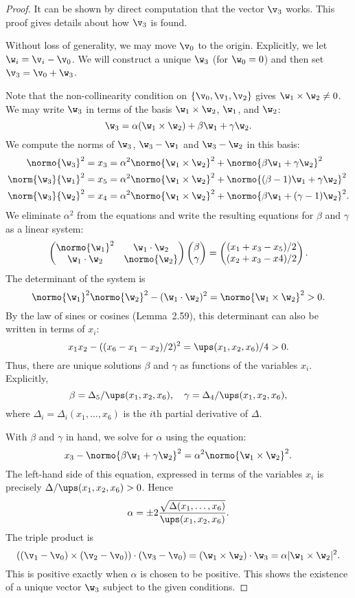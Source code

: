 \begin{proof}
It can be shown by direct computation that the vector $\v_3$ works.  This proof gives details about how
$\v_3$ is found.

Without loss of generality, we may move $\v_0$ to the origin.  Explicitly,
we let $\w_i = \v_i - \v_0$.  We will construct a unique $\w_3$ (for $\w_0=0$) and then set $\v_3 = \v_0 + \w_3$.

Note that the non-collinearity condition on $\{\v_0,\v_1,\v_2\}$ gives $\w_1\times\w_2\ne 0$.
We may write $\w_3$ in terms of the basis $\w_1\times\w_2$, $\w_1$, and $\w_2$:
\[
\w_3 = \alpha (\w_1\times \w_2) + \beta \w_1 + \gamma \w_2.
\]
We compute the norms of $\w_3$, $\w_3 - \w_1$ and $\w_3-\w_2$ in this basis:
\begin{align*}
\normo{\w_3}^2 = x_3 &= \alpha^2 \normo{\w_1\times\w_2}^2 + \normo{\beta\w_1+\gamma\w_2}^2 \\
\norm{\w_3}{\w_1}^2 = x_5 &= \alpha^2 \normo{\w_1\times\w_2}^2 + \normo{(\beta-1)\w_1 + \gamma\w_2}^2\\
\norm{\w_3}{\w_2}^2 = x_4 &= \alpha^2\normo{\w_1\times\w_2}^2 +\normo{\beta\w_1 + (\gamma-1)\w_2}^2.
\end{align*}
We eliminate $\alpha^2$ from the equations and write the resulting equations for $\beta$ and $\gamma$ as
a linear system:
\[
\left(\begin{matrix} \normo{\w_1}^2 & \w_1\cdot \w_2 \\ \w_1\cdot \w_2 & \normo{\w_2} \end{matrix}\right)
\left(\begin{matrix} \beta \\ \gamma \end{matrix}\right) = 
\left(\begin{matrix} (x_1 + x_3 - x_5)/2 \\ (x_2 + x_3 - x4)/2 \end{matrix}\right).
\]
The determinant of the system is 
\[
\normo{\w_1}^2\normo{\w_2}^2 - (\w_1\cdot \w_2)^2 = \normo{\w_1\times \w_2}^2 >  0.
\]
By the law of sines or cosines (Lemma~2.59), this determinant can also be written in terms of $x_i$:
\[
x_1 x_2 - ((x_6 - x_1 - x_2)/2)^2 = \ups(x_1,x_2,x_6)/4 > 0.
\]
Thus, there are unique solutions $\beta$ and $\gamma$ as functions of the variables $x_i$. Explicitly,
\[
\beta = \Delta_5/\ups(x_1,x_2,x_6),\quad \gamma = \Delta_4/\ups(x_1,x_2,x_6),
\]
where $\Delta_i=\Delta_i(x_1,\ldots,x_6)$ is the $i$th partial derivative of $\Delta$.

With $\beta$ and $\gamma$ in hand, we solve for $\alpha$ using the equation:
\[
x_3 - \normo{\beta\w_1 + \gamma\w_2}^2 = \alpha^2 \normo{\w_1\times \w_2}^2.
\]
The left-hand side of this equation, expressed in terms of the variables $x_i$ is precisely $\Delta/\ups(x_1,x_2,x_6) >0$.
Hence 
\[
\alpha = \pm 2\frac{\sqrt{\Delta(x_1,\ldots,x_6)}} {\ups(x_1,x_2,x_6)}.
\]
The triple product is
\[
((\v_1 - \v_0) \times (\v_2 - \v_0)) \cdot (\v_3 - \v_0) = (\w_1 \times \w_2) \cdot \w_3 = \alpha |\w_1\times \w_2|^2.
\]
This is positive exactly when $\alpha$ is chosen to be positive.
This shows the existence of a unique vector $\w_3$ subject to the given conditions.


\end{proof}

